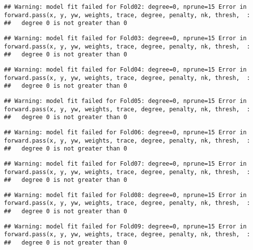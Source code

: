 \documentclass[
]{article}
\begin{document}
\begin{verbatim}
## Warning: model fit failed for Fold02: degree=0, nprune=15 Error in forward.pass(x, y, yw, weights, trace, degree, penalty, nk, thresh,  : 
##   degree 0 is not greater than 0
\end{verbatim}

\begin{verbatim}
## Warning: model fit failed for Fold03: degree=0, nprune=15 Error in forward.pass(x, y, yw, weights, trace, degree, penalty, nk, thresh,  : 
##   degree 0 is not greater than 0
\end{verbatim}

\begin{verbatim}
## Warning: model fit failed for Fold04: degree=0, nprune=15 Error in forward.pass(x, y, yw, weights, trace, degree, penalty, nk, thresh,  : 
##   degree 0 is not greater than 0
\end{verbatim}

\begin{verbatim}
## Warning: model fit failed for Fold05: degree=0, nprune=15 Error in forward.pass(x, y, yw, weights, trace, degree, penalty, nk, thresh,  : 
##   degree 0 is not greater than 0
\end{verbatim}

\begin{verbatim}
## Warning: model fit failed for Fold06: degree=0, nprune=15 Error in forward.pass(x, y, yw, weights, trace, degree, penalty, nk, thresh,  : 
##   degree 0 is not greater than 0
\end{verbatim}

\begin{verbatim}
## Warning: model fit failed for Fold07: degree=0, nprune=15 Error in forward.pass(x, y, yw, weights, trace, degree, penalty, nk, thresh,  : 
##   degree 0 is not greater than 0
\end{verbatim}

\begin{verbatim}
## Warning: model fit failed for Fold08: degree=0, nprune=15 Error in forward.pass(x, y, yw, weights, trace, degree, penalty, nk, thresh,  : 
##   degree 0 is not greater than 0
\end{verbatim}

\begin{verbatim}
## Warning: model fit failed for Fold09: degree=0, nprune=15 Error in forward.pass(x, y, yw, weights, trace, degree, penalty, nk, thresh,  : 
##   degree 0 is not greater than 0
\end{verbatim}
\end{document}
